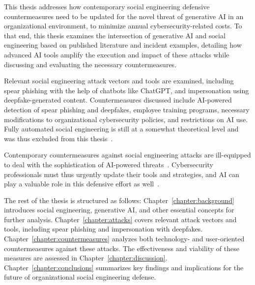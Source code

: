 %
%
This thesis addresses how contemporary social engineering defensive countermeasures need to be updated for the novel threat of generative AI in an organizational environment, to minimize annual cybersecurity-related costs. To that end, this thesis examines the intersection of generative AI and social engineering based on published literature and incident examples, detailing how advanced AI tools amplify the execution and impact of these attacks while discussing and evaluating the necessary countermeasures.





%
%
Relevant social engineering attack vectors and tools are examined, including spear phishing with the help of chatbots like ChatGPT, and impersonation using deepfake-generated content. Countermeasures discussed include AI-powered detection of spear phishing and deepfakes, employee training programs, necessary modifications to organizational cybersecurity policies, and restrictions on AI use. Fully automated social engineering is still at a somewhat theoretical level and was thus excluded from this thesis~\citep{hatfield_SE_Evolution_Concept_2018}.


%
%
Contemporary countermeasures against social engineering attacks are ill-equipped to deal with the sophistication of AI-powered threats~\citep{blauth_AI_Crime_Overview_Malicious_Use_Abuse_2022, king_AI_Crime_Interdisciplinary_Analysis_2019}. Cybersecurity professionals must thus urgently update their tools and strategies, and AI can play a valuable role in this defensive effort as well~\citep{fakhouri_AI_Driven_Solutions_SE_Attacks_2024, tsinganos_Towards_Automated_Recognition_Chat_SE_Enterprise_2018}.





%
%
The rest of the thesis is structured as follows: Chapter~\ref{chapter:background} introduces social engineering, generative AI, and other essential concepts for further analysis. Chapter~\ref{chapter:attacks} covers relevant attack vectors and tools, including spear phishing and impersonation with deepfakes. Chapter~\ref{chapter:countermeasures} analyzes both technology- and user-oriented countermeasures against these attacks. The effectiveness and viability of these measures are assessed in Chapter~\ref{chapter:discussion}. Chapter~\ref{chapter:conclusions} summarizes key findings and implications for the future of organizational social engineering defense.
